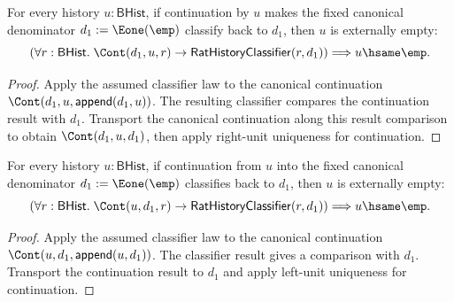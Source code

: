 \begin{theorem}
\label{thm:field-rat-denominator-canonical-right-unit-endpoint-empty}
For every history $u:\mathsf{BHist}$, if continuation by $u$ makes the fixed
canonical denominator $d_1:=\Eone(\emp)$ classify back to $d_1$, then $u$ is
externally empty:
$$
\left(
  \forall r:\mathsf{BHist}.\;
  \Cont(d_1,u,r)\to
  \mathsf{RatHistoryClassifier}(r,d_1)
\right)
\Longrightarrow
u\hsame\emp.
$$
\end{theorem}
\begin{proof}
Apply the assumed classifier law to the canonical continuation
$\Cont(d_1,u,\mathsf{append}(d_1,u))$. The resulting classifier compares the
continuation result with $d_1$. Transport the canonical continuation along
this result comparison to obtain $\Cont(d_1,u,d_1)$, then apply right-unit
uniqueness for continuation.
\end{proof}

\begin{theorem}
\label{thm:field-rat-denominator-canonical-left-unit-endpoint-empty}
For every history $u:\mathsf{BHist}$, if continuation from $u$ into the fixed
canonical denominator $d_1:=\Eone(\emp)$ classifies back to $d_1$, then $u$ is
externally empty:
$$
\left(
  \forall r:\mathsf{BHist}.\;
  \Cont(u,d_1,r)\to
  \mathsf{RatHistoryClassifier}(r,d_1)
\right)
\Longrightarrow
u\hsame\emp.
$$
\end{theorem}
\begin{proof}
Apply the assumed classifier law to the canonical continuation
$\Cont(u,d_1,\mathsf{append}(u,d_1))$. The classifier result gives a comparison
with $d_1$. Transport the continuation result to $d_1$ and apply left-unit
uniqueness for continuation.
\end{proof}

